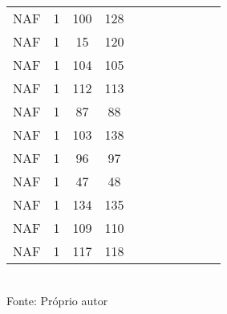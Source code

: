 \begin{table}[H]
{\begin{tabular}{ccccccccccc}
NAF & 1 & 100 & 128 &  &  &  &  &  &  &  \\
NAF & 1 & 15 & 120 &  &  &  &  &  &  &  \\
NAF & 1 & 104 & 105 &  &  &  &  &  &  &  \\
NAF & 1 & 112 & 113 &  &  &  &  &  &  &  \\
NAF & 1 & 87 & 88 &  &  &  &  &  &  &  \\
NAF & 1 & 103 & 138 &  &  &  &  &  &  &  \\
NAF & 1 & 96 & 97 &  &  &  &  &  &  &  \\
NAF & 1 & 47 & 48 &  &  &  &  &  &  &  \\
NAF & 1 & 134 & 135 &  &  &  &  &  &  &  \\
NAF & 1 & 109 & 110 &  &  &  &  &  &  &  \\
NAF & 1 & 117 & 118 &  &  &  &  &  &  &  \\
\bottomrule
\end{tabular}}
\\Fonte: Próprio autor
\end{table}


